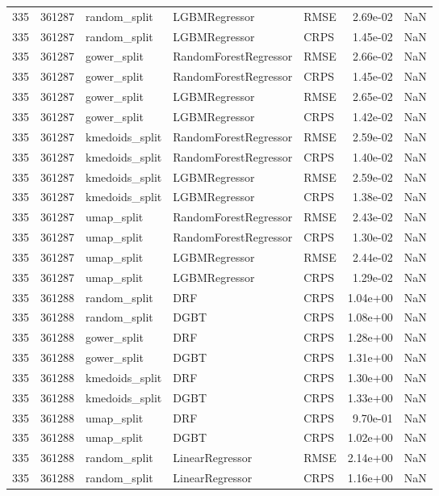 \begin{tabular}{rrlllrr}
335 & 361287 & random\_split & LGBMRegressor & RMSE & 2.69e-02 & NaN \\
335 & 361287 & random\_split & LGBMRegressor & CRPS & 1.45e-02 & NaN \\
335 & 361287 & gower\_split & RandomForestRegressor & RMSE & 2.66e-02 & NaN \\
335 & 361287 & gower\_split & RandomForestRegressor & CRPS & 1.45e-02 & NaN \\
335 & 361287 & gower\_split & LGBMRegressor & RMSE & 2.65e-02 & NaN \\
335 & 361287 & gower\_split & LGBMRegressor & CRPS & 1.42e-02 & NaN \\
335 & 361287 & kmedoids\_split & RandomForestRegressor & RMSE & 2.59e-02 & NaN \\
335 & 361287 & kmedoids\_split & RandomForestRegressor & CRPS & 1.40e-02 & NaN \\
335 & 361287 & kmedoids\_split & LGBMRegressor & RMSE & 2.59e-02 & NaN \\
335 & 361287 & kmedoids\_split & LGBMRegressor & CRPS & 1.38e-02 & NaN \\
335 & 361287 & umap\_split & RandomForestRegressor & RMSE & 2.43e-02 & NaN \\
335 & 361287 & umap\_split & RandomForestRegressor & CRPS & 1.30e-02 & NaN \\
335 & 361287 & umap\_split & LGBMRegressor & RMSE & 2.44e-02 & NaN \\
335 & 361287 & umap\_split & LGBMRegressor & CRPS & 1.29e-02 & NaN \\
335 & 361288 & random\_split & DRF & CRPS & 1.04e+00 & NaN \\
335 & 361288 & random\_split & DGBT & CRPS & 1.08e+00 & NaN \\
335 & 361288 & gower\_split & DRF & CRPS & 1.28e+00 & NaN \\
335 & 361288 & gower\_split & DGBT & CRPS & 1.31e+00 & NaN \\
335 & 361288 & kmedoids\_split & DRF & CRPS & 1.30e+00 & NaN \\
335 & 361288 & kmedoids\_split & DGBT & CRPS & 1.33e+00 & NaN \\
335 & 361288 & umap\_split & DRF & CRPS & 9.70e-01 & NaN \\
335 & 361288 & umap\_split & DGBT & CRPS & 1.02e+00 & NaN \\
335 & 361288 & random\_split & LinearRegressor & RMSE & 2.14e+00 & NaN \\
335 & 361288 & random\_split & LinearRegressor & CRPS & 1.16e+00 & NaN \\

\end{tabular}
